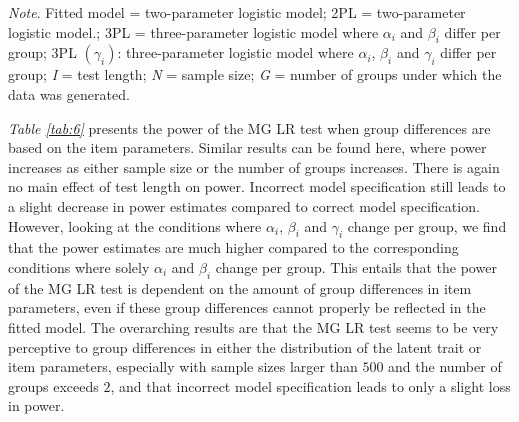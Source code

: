 \documentclass[Royal,sageapa,times,doublespace]{sagej}
\begin{document}
\begin{table}[ht!]
\bigskip
\small\textit{Note}. Fitted model = two-parameter logistic model; 2PL = two-parameter logistic model.; 3PL = three-parameter logistic model where $\alpha_i$ and $\beta_i$ differ per group; 3PL $ (\gamma_i)$: three-parameter logistic model where $\alpha_i$, $\beta_i$ and $\gamma_i$ differ per group; \textit{I} = test length; \textit{N} = sample size; \textit{G} = number of groups under which the data was generated.
\label{tab:6}
\end{table}

\indent \textit{Table \ref{tab:6}} presents the power of the MG LR test when group differences are based on the item parameters. Similar results can be found here, where power increases as either sample size or the number of groups increases. There is again no main effect of test length on power. Incorrect model specification still leads to a slight decrease in power estimates compared to correct model specification. However, looking at the conditions where $\alpha_i$, $\beta_i$ and $\gamma_i$ change per group, we find that the power estimates are much higher compared to the corresponding conditions where solely $\alpha_i$ and $\beta_i$ change per group. This entails that the power of the MG LR test is dependent on the amount of group differences in item parameters, even if these group differences cannot properly be reflected in the fitted model. The overarching results are that the MG LR test seems to be very perceptive to group differences in either the distribution of the latent trait or item parameters, especially with sample sizes larger than $500$ and the number of groups exceeds $2$, and that incorrect model specification leads to only a slight loss in power.
\end{document}
